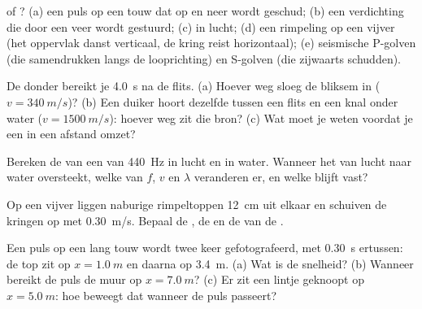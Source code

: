 \begin{exercise}[$\star$]\label{exo:g12:mechanical-waves:2}
 of ? (a) een puls op een touw dat op en neer
wordt geschud; (b) een verdichting die door een veer wordt gestuurd;
(c)  in lucht; (d) een rimpeling op een vijver (het oppervlak danst
verticaal, de kring reist horizontaal); (e) seismische P-golven (die
samendrukken langs de looprichting) en S-golven (die zijwaarts schudden).
\end{exercise}

\begin{exercise}[$\star$]\label{exo:g12:mechanical-waves:3}
De donder bereikt je \qty{4.0}{s} na de flits. (a) Hoever weg sloeg de
bliksem in ($v = \qty{340}{m/s}$)? (b) Een duiker hoort dezelfde
 tussen een flits en een knal onder water
($v = \qty{1500}{m/s}$): hoever weg zit die bron? (c) Wat moet je weten
voordat je een  in een afstand omzet?
\end{exercise}

\begin{exercise}[$\star$]\label{exo:g12:mechanical-waves:4}
Bereken de  van een  van \qty{440}{Hz} in lucht en in
water. Wanneer het  van lucht naar water oversteekt, welke van $f$,
$v$ en $\lambda$ veranderen er, en welke blijft vast?
\end{exercise}

\begin{exercise}[$\star$]\label{exo:g12:mechanical-waves:5}
Op een vijver liggen naburige rimpeltoppen \qty{12}{cm} uit elkaar en
schuiven de kringen op met \qty{0.30}{m/s}. Bepaal de , de
 en de  van de .
\end{exercise}

\begin{exercise}[$\star\star$]\label{exo:g12:mechanical-waves:6}
Een puls op een lang touw wordt twee keer gefotografeerd, met
\qty{0.30}{s} ertussen: de top zit op $x = \qty{1.0}{m}$ en daarna op
\qty{3.4}{m}. (a) Wat is de snelheid? (b) Wanneer bereikt de puls de muur
op $x = \qty{7.0}{m}$? (c) Er zit een lintje geknoopt op
$x = \qty{5.0}{m}$: hoe beweegt dat wanneer de puls passeert?
\end{exercise}

